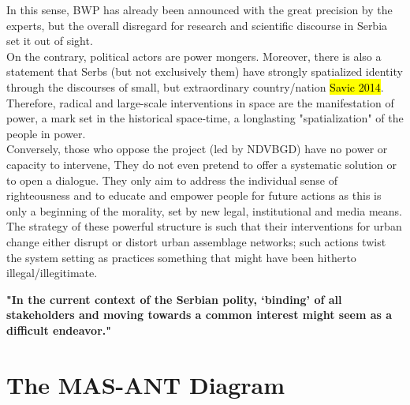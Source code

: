 \documentclass[11pt]{report}
\begin{document}
In this sense, BWP has already been announced with the great precision by the experts, but the overall disregard for research and scientific discourse in Serbia set it out of sight.
\\
On the contrary, political actors are power mongers.
Moreover, there is also a statement that Serbs (but not exclusively them) have strongly spatialized identity through the discourses of small, but extraordinary country/nation \hl{Savic 2014}.
Therefore, radical and large-scale interventions in space are the manifestation of power, a mark set in the historical space-time, a longlasting "spatialization" of the people in power.
\\
Conversely, those who oppose the project (led by NDVBGD) have no power or capacity to intervene, They do not even pretend to offer a systematic solution or to open a dialogue. They only aim to address the individual sense of righteousness and to educate and empower people for future actions as this is only a beginning of the morality, set by new legal, institutional and media means.
The strategy of these powerful structure is such that their interventions for urban change either disrupt or distort urban assemblage networks; such actions twist the system setting as practices something that might have been hitherto illegal/illegitimate.

\textbf{"In the current context  of  the  Serbian  polity,  ‘binding’  of  all stakeholders  and  moving  towards  a  common interest  might  seem  as  a  difficult  endeavor." \cite{Volic et al, 2012}}


\section{The MAS-ANT Diagram}
\end{document}
